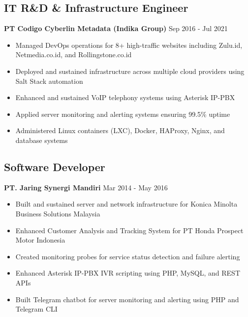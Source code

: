 \documentclass[11pt,a4paper]{article}
\newcommand{\company}[1]{\textbf{\color{primary}#1}}
\newcommand{\daterange}[1]{\color{secondary}#1}  %
\begin{document}
\subsection{IT R\&D \& Infrastructure Engineer}
\company{PT Codigo Cyberlin Metadata (Indika Group)} \hfill \daterange{Sep 2016 - Jul 2021}
\begin{itemize}[leftmargin=*, itemsep=2pt]
    \item Managed DevOps operations for 8+ high-traffic websites including Zulu.id, Netmedia.co.id, and Rollingstone.co.id
            \item Deployed and sustained infrastructure across multiple cloud providers using Salt Stack automation
            \item Enhanced and sustained VoIP telephony systems using Asterisk IP-PBX
            \item Applied server monitoring and alerting systems ensuring 99.5\% uptime
    \item Administered Linux containers (LXC), Docker, HAProxy, Nginx, and database systems
\end{itemize}

\subsection{Software Developer}
\company{PT. Jaring Synergi Mandiri} \hfill \daterange{Mar 2014 - May 2016}
\begin{itemize}[leftmargin=*, itemsep=2pt]
            \item Built and sustained server and network infrastructure for Konica Minolta Business Solutions Malaysia
            \item Enhanced Customer Analysis and Tracking System for PT Honda Prospect Motor Indonesia
    \item Created monitoring probes for service status detection and failure alerting
            \item Enhanced Asterisk IP-PBX IVR scripting using PHP, MySQL, and REST APIs
    \item Built Telegram chatbot for server monitoring and alerting using PHP and Telegram CLI
\end{itemize}

\end{document}
